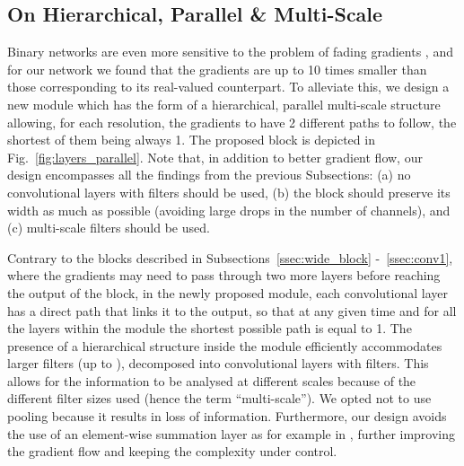 \documentclass[10pt,journal,compsoc]{IEEEtran}
\begin{document}
\subsection{On Hierarchical, Parallel \& Multi-Scale}\label{ssec:better}

Binary networks are even more sensitive to the problem of fading gradients \cite{courbariaux2016binarized,rastegari2016xnor}, and for our network we found that the gradients are up to 10 times smaller than those corresponding to its real-valued counterpart. To alleviate this, we design a new module which has the form of a hierarchical, parallel multi-scale structure allowing, for each resolution, the gradients to have 2 different paths to follow, the shortest of them being always 1. The proposed block is depicted in Fig.~\ref{fig:layers_parallel}. Note that, in addition to better gradient flow, our design encompasses all the findings from the previous Subsections: (a) no convolutional layers with  filters should be used, (b) the block should preserve its width as much as possible (avoiding large drops in the number of channels), and (c) multi-scale filters should be used.

Contrary to the blocks described in Subsections~\ref{ssec:wide_block} -~\ref{ssec:conv1}, where the gradients may need to pass through two more layers before reaching the output of the block, in the newly proposed module, each convolutional layer has a direct path that links it to the output, so that at any given time and for all the layers within the module the shortest possible path is equal to 1. The presence of a hierarchical structure inside the module efficiently accommodates larger filters (up to ), decomposed into convolutional layers with  filters. {\color{black} This allows for the information to be analysed at different scales because of the different filter sizes used  (hence the term ``multi-scale''). We opted not to use pooling because it results in loss of information. } Furthermore, our design avoids the use of an element-wise summation layer as for example in \cite{xie2016aggregated,szegedy2017inception}, further improving the gradient flow and keeping the complexity under control.
\end{document}
